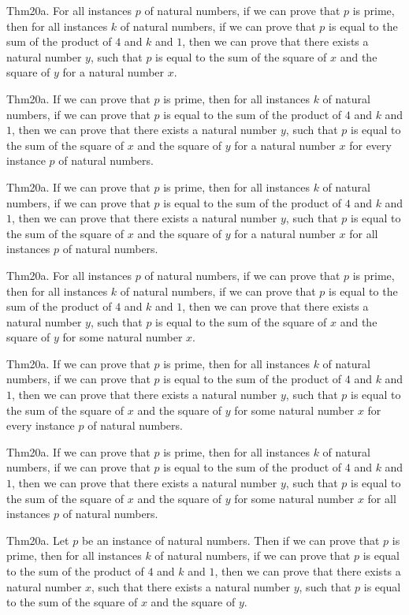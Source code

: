 \documentclass{article}
\begin{document}
Thm20a. For all instances $p$ of natural numbers, if we can prove that $p$ is prime, then for all instances $k$ of natural numbers, if we can prove that $p$ is equal to the sum of the product of $4$ and $k$ and $1$, then we can prove that there exists a natural number $y$, such that $p$ is equal to the sum of the square of $x$ and the square of $y$ for a natural number $x$.

Thm20a. If we can prove that $p$ is prime, then for all instances $k$ of natural numbers, if we can prove that $p$ is equal to the sum of the product of $4$ and $k$ and $1$, then we can prove that there exists a natural number $y$, such that $p$ is equal to the sum of the square of $x$ and the square of $y$ for a natural number $x$ for every instance $p$ of natural numbers.

Thm20a. If we can prove that $p$ is prime, then for all instances $k$ of natural numbers, if we can prove that $p$ is equal to the sum of the product of $4$ and $k$ and $1$, then we can prove that there exists a natural number $y$, such that $p$ is equal to the sum of the square of $x$ and the square of $y$ for a natural number $x$ for all instances $p$ of natural numbers.

Thm20a. For all instances $p$ of natural numbers, if we can prove that $p$ is prime, then for all instances $k$ of natural numbers, if we can prove that $p$ is equal to the sum of the product of $4$ and $k$ and $1$, then we can prove that there exists a natural number $y$, such that $p$ is equal to the sum of the square of $x$ and the square of $y$ for some natural number $x$.

Thm20a. If we can prove that $p$ is prime, then for all instances $k$ of natural numbers, if we can prove that $p$ is equal to the sum of the product of $4$ and $k$ and $1$, then we can prove that there exists a natural number $y$, such that $p$ is equal to the sum of the square of $x$ and the square of $y$ for some natural number $x$ for every instance $p$ of natural numbers.

Thm20a. If we can prove that $p$ is prime, then for all instances $k$ of natural numbers, if we can prove that $p$ is equal to the sum of the product of $4$ and $k$ and $1$, then we can prove that there exists a natural number $y$, such that $p$ is equal to the sum of the square of $x$ and the square of $y$ for some natural number $x$ for all instances $p$ of natural numbers.

Thm20a. Let $p$ be an instance of natural numbers. Then if we can prove that $p$ is prime, then for all instances $k$ of natural numbers, if we can prove that $p$ is equal to the sum of the product of $4$ and $k$ and $1$, then we can prove that there exists a natural number $x$, such that there exists a natural number $y$, such that $p$ is equal to the sum of the square of $x$ and the square of $y$.
\end{document}
